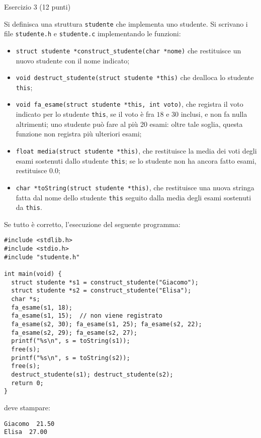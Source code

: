 \documentclass[12pt]{article}
\begin{document}
\begin{center}
{\Large Esercizio 3} (12 punti)
\end{center}
Si definisca una struttura \texttt{studente} che implementa uno studente.
Si scrivano i file \texttt{studente.h} e \texttt{studente.c} implementando le funzioni:
%
\begin{itemize}
\itemsep0em
\item \texttt{struct studente *construct\_studente(char *nome)} che restituisce un
      nuovo studente con il nome indicato;
\item \texttt{void destruct\_studente(struct studente *this)} che dealloca lo studente \texttt{this};
\item \texttt{void fa\_esame(struct studente *this, int voto)},
      che registra il voto indicato per lo studente \texttt{this}, se il voto \`e
      fra $18$ e $30$ inclusi, e non fa nulla altrimenti; uno studente pu\`o fare al pi\`u 20 esami:
      oltre tale soglia, questa funzione non registra pi\`u ulteriori esami;
\item \texttt{float media(struct studente *this)}, che restituisce la media dei voti
      degli esami sostenuti dallo studente \texttt{this}; se lo studente non ha ancora fatto esami,
      restituisce $0.0$;
\item \texttt{char *toString(struct studente *this)}, che restituisce una nuova stringa
      fatta dal nome dello studente \texttt{this} seguito dalla media degli esami sostenuti da
      \texttt{this}.
\end{itemize}
%
Se tutto \`e corretto, l'esecuzione del seguente programma:

\begin{lstlisting}
#include <stdlib.h>
#include <stdio.h>
#include "studente.h"

int main(void) {
  struct studente *s1 = construct_studente("Giacomo");
  struct studente *s2 = construct_studente("Elisa");
  char *s;
  fa_esame(s1, 18);
  fa_esame(s1, 15);  // non viene registrato
  fa_esame(s2, 30); fa_esame(s1, 25); fa_esame(s2, 22);
  fa_esame(s2, 29); fa_esame(s2, 27);
  printf("%s\n", s = toString(s1));
  free(s);
  printf("%s\n", s = toString(s2));
  free(s);
  destruct_studente(s1); destruct_studente(s2);
  return 0;
}
\end{lstlisting}

\noindent
deve stampare:

{\small
\begin{verbatim}
Giacomo  21.50
Elisa  27.00
\end{verbatim}
}
\end{document}
